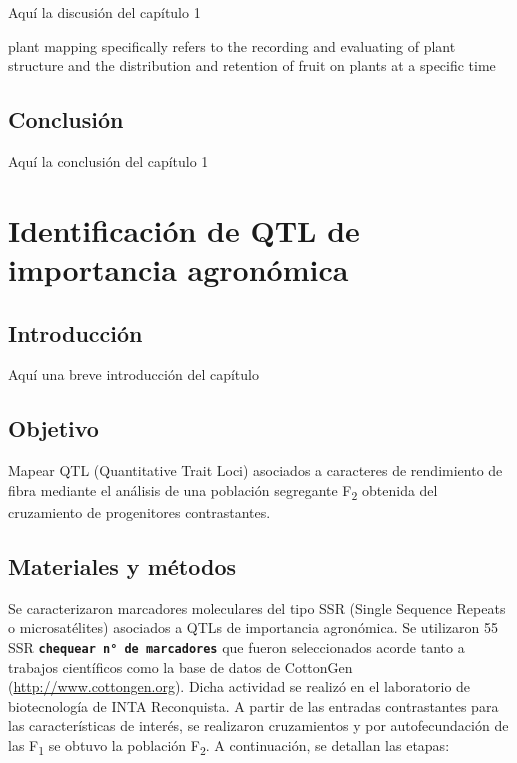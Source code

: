 \documentclass[12pt,oneside]{reedthesis}
\begin{document}
Aquí la discusión del capítulo 1

plant mapping specifically refers to the recording and evaluating of plant structure and the distribution and retention of fruit on plants at a specific time \autocite{kerby2010}

\section{Conclusión}\label{conclusiuxf3n}

Aquí la conclusión del capítulo 1

\chapter{Identificación de QTL de importancia agronómica}\label{math-sci}

\section{Introducción}\label{introducciuxf3n-2}

Aquí una breve introducción del capítulo

\section{Objetivo}\label{objetivo}

Mapear QTL (Quantitative Trait Loci) asociados a caracteres de rendimiento de fibra mediante el análisis de una población segregante F\textsubscript{2} obtenida del cruzamiento de progenitores contrastantes.

\section{Materiales y métodos}\label{materiales-y-muxe9todos-1}

Se caracterizaron marcadores moleculares del tipo SSR (Single Sequence Repeats o microsatélites) asociados a QTLs de importancia agronómica. Se utilizaron 55 SSR \textbf{\texttt{chequear\ n°\ de\ marcadores}} que fueron seleccionados acorde tanto a trabajos científicos \autocite{zhang2005,shen2007,wang2007,wang2014,xia2014,wang2015,an2010,liu2012,qin2015,shi2015,su2016,zhang2016,ademe2017,liu2017,iqbal2017,li2017,baytar2018,liu2018} como la base de datos de CottonGen (\url{http://www.cottongen.org}). Dicha actividad se realizó en el laboratorio de biotecnología de INTA Reconquista. A partir de las entradas contrastantes para las características de interés, se realizaron cruzamientos y por autofecundación de las F\textsubscript{1} se obtuvo la población F\textsubscript{2}. A continuación, se detallan las etapas:
\end{document}
